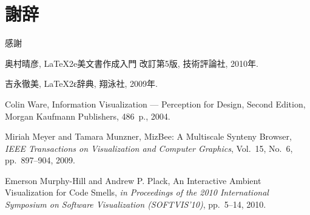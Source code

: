 \documentclass[a4paper,11pt]{jreport}
\begin{document}
\chapter*{謝辞}

感謝

\newpage


\renewcommand{\bibname}{参考文献}

%
%

\begin{thebibliography}{1}
奥村晴彦, LaTeX2e美文書作成入門 改訂第5版, 技術評論社, 2010年.

吉永徹美, LaTeX2ε辞典, 翔泳社, 2009年.

Colin Ware, Information Visualization --- Perception for Design, Second Edition, Morgan Kaufmann Publishers, 486~p., 2004.

Miriah Meyer and Tamara Munzner, MizBee: A Multiscale Synteny Browser, {\em IEEE Transactions on Visualization and Computer Graphics}, Vol.~15, No.~6, pp.~897--904, 2009.

Emerson Murphy-Hill and Andrew P. Plack, An Interactive Ambient Visualization for Code Smells, {\em in Proceedings of the 2010 International Symposium on Software Visualization (SOFTVIS’10)}, pp.~5--14, 2010.

\end{thebibliography}
\end{document}
